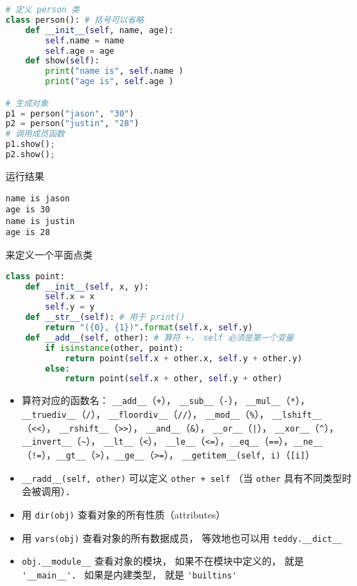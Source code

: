 
\begin{issues}
\issueDraft
\end{issues}


\begin{lstlisting}[language=python]
# 定义 person 类
class person(): # 括号可以省略
    def __init__(self, name, age): 
        self.name = name 
        self.age = age 
    def show(self): 
        print("name is", self.name ) 
        print("age is", self.age ) 

# 生成对象
p1 = person("jason", "30") 
p2 = person("justin", "28")
# 调用成员函数
p1.show();
p2.show();
\end{lstlisting}
运行结果
\begin{lstlisting}
name is jason
age is 30
name is justin
age is 28
\end{lstlisting}

来定义一个平面点类
\begin{lstlisting}[language=python]
class point:
    def __init__(self, x, y): 
        self.x = x 
        self.y = y 
    def __str__(self): # 用于 print()
        return "({0}, {1})".format(self.x, self.y)
    def __add__(self, other): # 算符 +， self 必须是第一个变量
        if isinstance(other, point):
            return point(self.x + other.x, self.y + other.y)
        else:
            return point(self.x + other, self.y + other)
\end{lstlisting}
\begin{itemize}
\item 算符对应的函数名： \verb|__add__|（\verb|+|）， \verb|__sub__|（\verb|-|）， \verb|__mul__|（\verb|*|）， \verb|__truediv__|（\verb|/|）， \verb|__floordiv__|（\verb|//|）， \verb|__mod__|（\verb|%|）， \verb|__lshift__|（\verb|<<|）， \verb|__rshift__|（\verb|>>|）， \verb|__and__|（\verb|&|）， \verb|__or__|（\verb`|`）， \verb|__xor__|（\verb|^|）， \verb|__invert__|（\verb|~|）， \verb|__lt__|（\verb|<|）， \verb|__le__|（\verb|<=|），\verb|__eq__|（\verb|==|），\verb|__ne__|（\verb|!=|），\verb|__gt__|（\verb|>|），\verb|__ge__|（\verb|>=|）， \verb|__getitem__(self, i)|（\verb|[i]|）
\item \verb|__radd__(self, other)| 可以定义 \verb|other + self| （当 \verb|other| 具有不同类型时会被调用）．
\item 用 \verb|dir(obj)| 查看对象的所有性质（attributes）
\item 用 \verb|vars(obj)| 查看对象的所有数据成员， 等效地也可以用 \verb|teddy.__dict__|
\item \verb|obj.__module__| 查看对象的模块， 如果不在模块中定义的， 就是 \verb|'__main__'|． 如果是内建类型， 就是 \verb|'builtins'|
\end{itemize}
